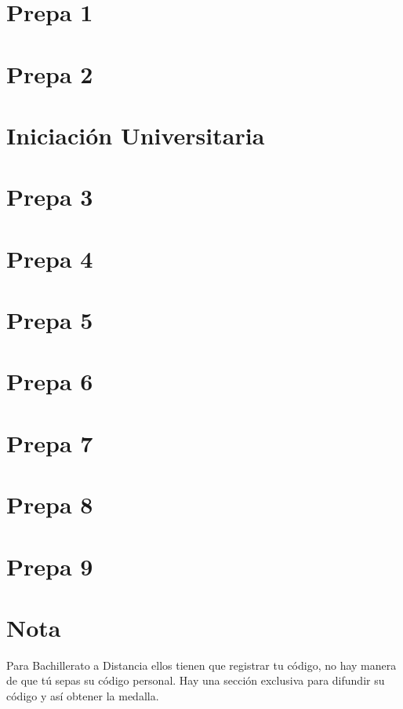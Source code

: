\section{Prepa 1}

\section{Prepa 2}

\section{Iniciación Universitaria}

\section{Prepa 3}

\section{Prepa 4}

\section{Prepa 5}

\section{Prepa 6}

\section{Prepa 7}

\section{Prepa 8}

\section{Prepa 9}

\section*{Nota}
Para Bachillerato a Distancia ellos tienen que registrar tu código, no hay manera de que tú sepas su código personal. Hay una sección exclusiva para difundir su código y así obtener la medalla.
